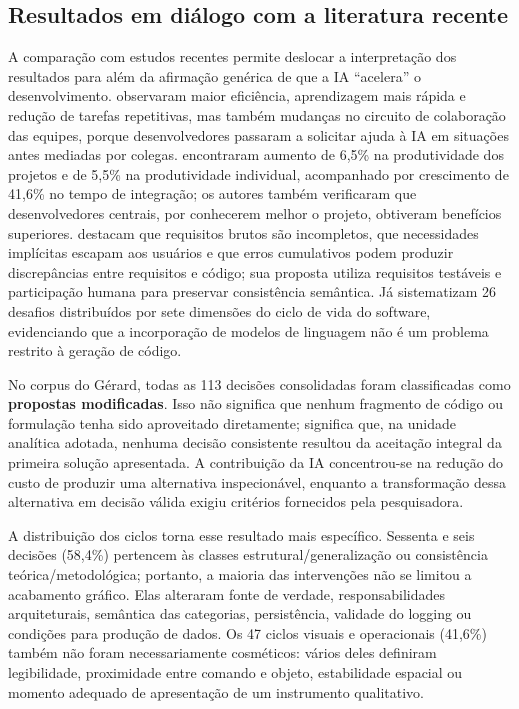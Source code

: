 \documentclass[preprint,12pt,authoryear]{elsarticle}
\newcommand{\gerard}{Gérard\xspace}
\begin{document}
\subsection{Resultados em diálogo com a literatura recente}
A comparação com estudos recentes permite deslocar a interpretação dos resultados para além da afirmação genérica de que a IA ``acelera'' o desenvolvimento. \citet{ulfsnes2024transforming} observaram maior eficiência, aprendizagem mais rápida e redução de tarefas repetitivas, mas também mudanças no circuito de colaboração das equipes, porque desenvolvedores passaram a solicitar ajuda à IA em situações antes mediadas por colegas. \citet{song2024impact} encontraram aumento de 6,5\% na produtividade dos projetos e de 5,5\% na produtividade individual, acompanhado por crescimento de 41,6\% no tempo de integração; os autores também verificaram que desenvolvedores centrais, por conhecerem melhor o projeto, obtiveram benefícios superiores. \citet{zhang2024agilegen} destacam que requisitos brutos são incompletos, que necessidades implícitas escapam aos usuários e que erros cumulativos podem produzir discrepâncias entre requisitos e código; sua proposta utiliza requisitos testáveis e participação humana para preservar consistência semântica. Já \citet{gao2024challenges} sistematizam 26 desafios distribuídos por sete dimensões do ciclo de vida do software, evidenciando que a incorporação de modelos de linguagem não é um problema restrito à geração de código.

No corpus do \gerard, todas as 113 decisões consolidadas foram classificadas como \textbf{propostas modificadas}. Isso não significa que nenhum fragmento de código ou formulação tenha sido aproveitado diretamente; significa que, na unidade analítica adotada, nenhuma decisão consistente resultou da aceitação integral da primeira solução apresentada. A contribuição da IA concentrou-se na redução do custo de produzir uma alternativa inspecionável, enquanto a transformação dessa alternativa em decisão válida exigiu critérios fornecidos pela pesquisadora.

A distribuição dos ciclos torna esse resultado mais específico. Sessenta e seis decisões (58,4\%) pertencem às classes estrutural/generalização ou consistência teórica/metodológica; portanto, a maioria das intervenções não se limitou a acabamento gráfico. Elas alteraram fonte de verdade, responsabilidades arquiteturais, semântica das categorias, persistência, validade do logging ou condições para produção de dados. Os 47 ciclos visuais e operacionais (41,6\%) também não foram necessariamente cosméticos: vários deles definiram legibilidade, proximidade entre comando e objeto, estabilidade espacial ou momento adequado de apresentação de um instrumento qualitativo.
\end{document}
